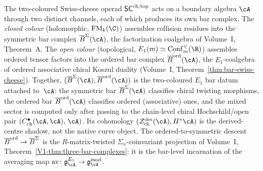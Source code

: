 \begin{remark}
\label{rem:sc-three-bar-complexes}
The two-coloured Swiss-cheese operad $\mathsf{SC}^{\mathrm{ch},\mathrm{top}}$ acts on a boundary
algebra $\cA$ through two distinct channels, each of which produces
its own bar complex. The \emph{closed colour} (holomorphic,
$\FM_k(\C)$) assembles collision residues into the symmetric bar
complex $\barB^{\Sigma}(\cA)$, the factorization coalgebra of
Volume~I, Theorem~A. The \emph{open colour} (topological,
$E_1(m) \simeq \Conf^<_m(\R)$) assembles ordered tensor factors
into the ordered bar complex $\barB^{\mathrm{ord}}(\cA)$, the
$E_1$-coalgebra of ordered associative chiral Koszul duality
(Volume~I, Theorem~\textup{\ref*{thm:bar-swiss-cheese}}).
Together, $(\barB^{\Sigma}(\cA), \barB^{\mathrm{ord}}(\cA))$ is
the two-coloured $E_1$ bar datum attached to~$\cA$: the symmetric bar
$\barB^{\Sigma}(\cA)$ classifies chiral twisting morphisms, the ordered
bar $\barB^{\mathrm{ord}}(\cA)$ classifies ordered (associative) ones,
and the mixed sector is computed only after passing to the chain-level
chiral Hochschild/open pair
$(C^\bullet_{\mathrm{ch}}(\cA,\cA),\, \cA)$. Its cohomology
$(\cZ^{\mathrm{der}}_{\mathrm{ch}}(\cA), H^\ast\cA)$ is the derived-centre
shadow, not the native curve object. The ordered-to-symmetric descent
$\overline{B}^{\mathrm{ord}} \to \overline{B}^{\Sigma}$ is the $R$-matrix-twisted
$\Sigma_n$-coinvariant projection of Volume~I,
Theorem~\textup{\ref*{V1-thm:three-bar-complexes}}: it is the bar-level
incarnation of the averaging map
$\mathrm{av}\colon \mathfrak{g}^{E_1}_{\cA} \to \mathfrak{g}^{\mathrm{mod}}_{\cA}$.
\end{remark}

